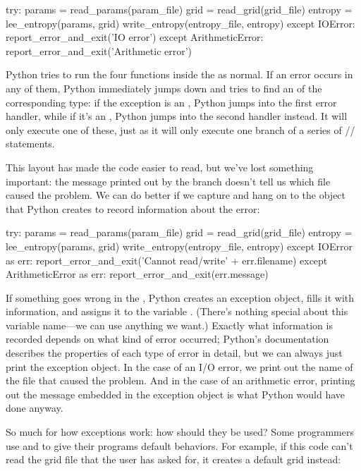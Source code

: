 \begin{VerbIn}
try:
    params = read_params(param_file)
    grid = read_grid(grid_file)
    entropy = lee_entropy(params, grid)
    write_entropy(entropy_file, entropy)
except IOError:
    report_error_and_exit('IO error')
except ArithmeticError:
    report_error_and_exit('Arithmetic error')
\end{VerbIn}

Python tries to run the four functions inside the  as
normal. If an error occurs in any of them, Python immediately jumps down
and tries to find an  of the corresponding type: if the
exception is an , Python jumps into the first error
handler, while if it's an , Python jumps into
the second handler instead. It will only execute one of these, just as
it will only execute one branch of a series of
// statements.

This layout has made the code easier to read, but we've lost something
important: the message printed out by the  branch
doesn't tell us which file caused the problem. We can do better if we
capture and hang on to the object that Python creates to record
information about the error:

\begin{VerbIn}
try:
    params = read_params(param_file)
    grid = read_grid(grid_file)
    entropy = lee_entropy(params, grid)
    write_entropy(entropy_file, entropy)
except IOError as err:
    report_error_and_exit('Cannot read/write' + err.filename)
except ArithmeticError as err:
    report_error_and_exit(err.message)
\end{VerbIn}

If something goes wrong in the , Python creates an exception
object, fills it with information, and assigns it to the variable
. (There's nothing special about this variable name---we can
use anything we want.) Exactly what information is recorded depends on
what kind of error occurred; Python's documentation describes the
properties of each type of error in detail, but we can always just print
the exception object. In the case of an I/O error, we print out the name
of the file that caused the problem. And in the case of an arithmetic
error, printing out the message embedded in the exception object is what
Python would have done anyway.

So much for how exceptions work: how should they be used? Some
programmers use  and  to give their programs
default behaviors. For example, if this code can't read the grid file
that the user has asked for, it creates a default grid instead:


